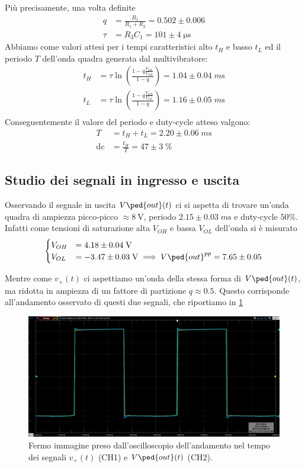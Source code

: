 \documentclass[10pt, a4paper, italian]{article}
\begin{document}
Più precisamente, una volta definite
\begin{align*}
q &= \frac{R_1}{R_1 + R_2} = 0.502 \pm 0.006 \\
\tau &= R_3 C_1 = 101 \pm 4 \; \si{\micro\s}
\end{align*}
Abbiamo come valori attesi per i tempi caratteristici alto $t_H$ e basso
$t_L$ ed il periodo $T$ dell'onda quadra generata dal multivibratore:
\begin{align}
t_H &= \tau \ln\left(\frac{1 - q\frac{V_{OL}}{V_{OH}}}{1-q}\right) =
1.04 \pm 0.04 \; \si{m\s} \\
t_L &= \tau \ln\left(\frac{1 - q\frac{V_{OH}}{V_{OL}}}{1-q}\right) =
1.16 \pm 0.05 \; \si{m\s} \\
\end{align}
Conseguentemente il valore del periodo e duty-cycle atteso valgono:
\begin{align}
T &= t_H + t_L = 2.20 \pm 0.06 \; \si{m\s} \\
\mathrm{dc} &= \frac{t_H}{T} = 47 \pm 3 \; \%
\end{align}

\setcounter{subsection}{2}
\subsection{Studio dei segnali in ingresso e uscita}
Osservando il segnale in uscita $V\ped{out} (t)$ ci si aspetta di trovare
un'onda quadra di ampiezza picco-picco $\approx \SI{8}{\V}$, periodo
$2.15 \pm 0.03 \; \si{m\s}$ e duty-cycle $50 \%$. Infatti come tensioni
di saturazione alta $V_{OH}$ e bassa $V_{OL}$ dell'onda si è misurato
\begin{align*}
\begin{cases}
V_{OH} &= 4.18 \pm 0.04 \; \si{\V} \\
V_{OL} &= -3.47 \pm 0.03 \; \si{\V}  \implies V\ped{out}^{pp} = 7.65 \pm 0.05
\end{cases}
\end{align*}

Mentre come $v_+ (t)$ ci aspettiamo un'onda della stessa forma di
$V\ped{out} (t)$, ma ridotta in ampiezza di un fattore di partizione
$q \approx 0.5$. Questo corrisponde all'andamento osservato di questi due
segnali, che riportiamo in \cref{fig: v+vout}
\begin{figure}[htbp]
\centering
\includegraphics[scale=0.4]{V+Vout}
\caption{Fermo immagine preso dall'oscilloscopio dell'andamento nel tempo dei
segnali $v_+ (t)$ (CH1) e $V\ped{out} (t)$ (CH2). \label{fig: v+vout}}
\end{figure}
\end{document}
